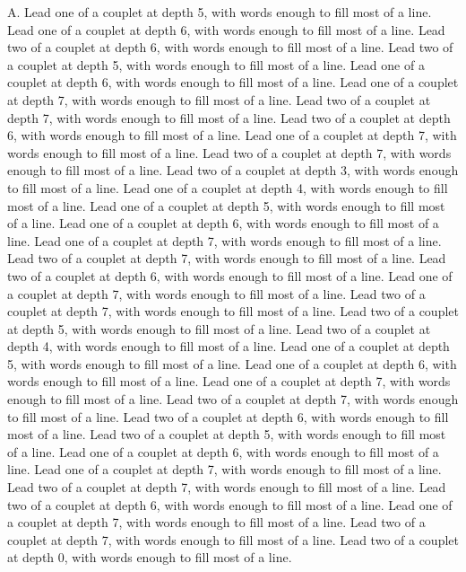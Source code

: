 \documentclass[a4paper]{article}
\begin{document}
\begin{Key}{A. }
\alter Lead one of a couplet at depth 5, with words enough to fill most of a line.
\alter Lead one of a couplet at depth 6, with words enough to fill most of a line.
\alter Lead two of a couplet at depth 6, with words enough to fill most of a line.
\alter Lead two of a couplet at depth 5, with words enough to fill most of a line.
\alter Lead one of a couplet at depth 6, with words enough to fill most of a line.
\alter Lead one of a couplet at depth 7, with words enough to fill most of a line.
\alter Lead two of a couplet at depth 7, with words enough to fill most of a line.
\alter Lead two of a couplet at depth 6, with words enough to fill most of a line.
\alter Lead one of a couplet at depth 7, with words enough to fill most of a line.
\alter Lead two of a couplet at depth 7, with words enough to fill most of a line.
\alter Lead two of a couplet at depth 3, with words enough to fill most of a line.
\alter Lead one of a couplet at depth 4, with words enough to fill most of a line.
\alter Lead one of a couplet at depth 5, with words enough to fill most of a line.
\alter Lead one of a couplet at depth 6, with words enough to fill most of a line.
\alter Lead one of a couplet at depth 7, with words enough to fill most of a line.
\alter Lead two of a couplet at depth 7, with words enough to fill most of a line.
\alter Lead two of a couplet at depth 6, with words enough to fill most of a line.
\alter Lead one of a couplet at depth 7, with words enough to fill most of a line.
\alter Lead two of a couplet at depth 7, with words enough to fill most of a line.
\alter Lead two of a couplet at depth 5, with words enough to fill most of a line.
\alter Lead two of a couplet at depth 4, with words enough to fill most of a line.
\alter Lead one of a couplet at depth 5, with words enough to fill most of a line.
\alter Lead one of a couplet at depth 6, with words enough to fill most of a line.
\alter Lead one of a couplet at depth 7, with words enough to fill most of a line.
\alter Lead two of a couplet at depth 7, with words enough to fill most of a line.
\alter Lead two of a couplet at depth 6, with words enough to fill most of a line.
\alter Lead two of a couplet at depth 5, with words enough to fill most of a line.
\alter Lead one of a couplet at depth 6, with words enough to fill most of a line.
\alter Lead one of a couplet at depth 7, with words enough to fill most of a line.
\alter Lead two of a couplet at depth 7, with words enough to fill most of a line.
\alter Lead two of a couplet at depth 6, with words enough to fill most of a line.
\alter Lead one of a couplet at depth 7, with words enough to fill most of a line.
\alter Lead two of a couplet at depth 7, with words enough to fill most of a line.
\alter Lead two of a couplet at depth 0, with words enough to fill most of a line.
\end{Key}
\end{document}
